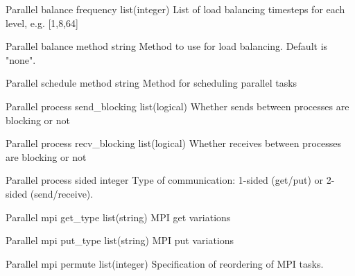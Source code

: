 \documentclass{book}
\begin{document}
\Parameter
{Parallel}
{balance}
{frequency}
{list(integer)}
{}
{List of load balancing timesteps for each level, e.g. [1,8,64]}
{}
{}

\Parameter
{Parallel}
{balance}
{method}
{string}
{}
{Method to use for load balancing. Default is "none".}
{}
{}

\Parameter
{Parallel}
{schedule}
{method}
{string}
{}
{Method for scheduling parallel tasks}
{}
{}

\Parameter
{Parallel}
{process}
{send\_blocking}
{list(logical)}
{}
{ Whether sends between processes are blocking or not}
{}
{}

\Parameter
{Parallel}
{process}
{recv\_blocking}
{list(logical)}
{}
{ Whether receives between processes are blocking or not}
{}
{}

\Parameter
{Parallel}
{process}
{sided}
{integer}
{}
{Type of communication: 1-sided (get/put) or 2-sided (send/receive). }
{}
{}


\Parameter
{Parallel}
{mpi}
{get\_type}
{list(string)}
{}
{MPI get variations}
{}
{}

\Parameter
{Parallel}
{mpi}
{put\_type}
{list(string)}
{}
{MPI put variations}
{}
{}

\Parameter
{Parallel}
{mpi}
{permute}
{list(integer)}
{}
{Specification of reordering of MPI tasks. }
{}
{}
\end{document}
